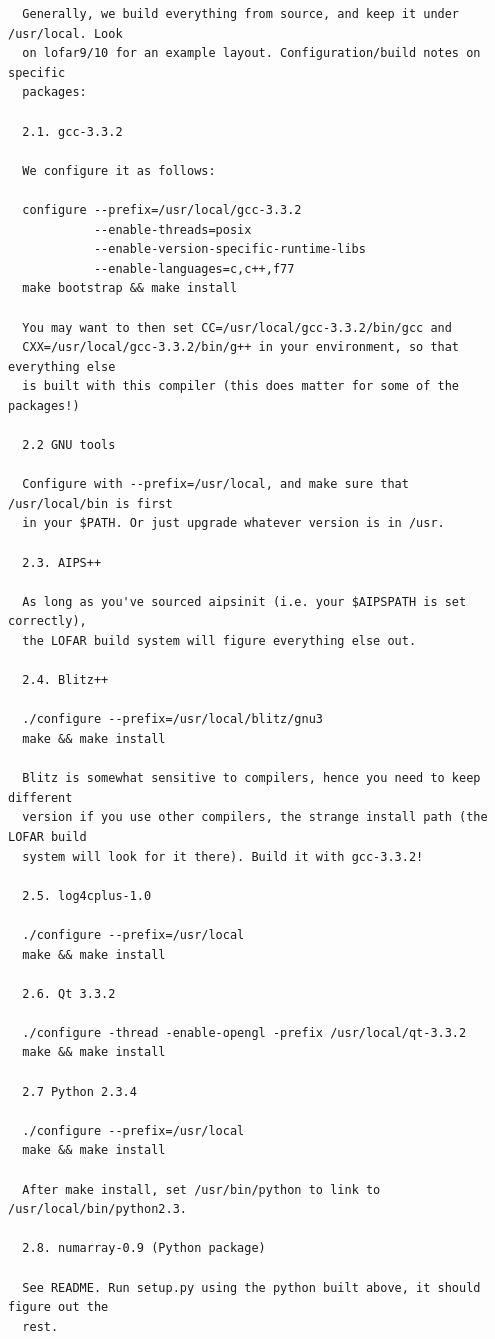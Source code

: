\documentclass[10pt]{article}
\begin{document}
\begin{verbatim}
  Generally, we build everything from source, and keep it under /usr/local. Look
  on lofar9/10 for an example layout. Configuration/build notes on specific
  packages:

  2.1. gcc-3.3.2 

  We configure it as follows:

  configure --prefix=/usr/local/gcc-3.3.2 
            --enable-threads=posix 
            --enable-version-specific-runtime-libs 
            --enable-languages=c,c++,f77
  make bootstrap && make install

  You may want to then set CC=/usr/local/gcc-3.3.2/bin/gcc and 
  CXX=/usr/local/gcc-3.3.2/bin/g++ in your environment, so that everything else
  is built with this compiler (this does matter for some of the packages!)

  2.2 GNU tools

  Configure with --prefix=/usr/local, and make sure that /usr/local/bin is first
  in your $PATH. Or just upgrade whatever version is in /usr.

  2.3. AIPS++ 

  As long as you've sourced aipsinit (i.e. your $AIPSPATH is set correctly),
  the LOFAR build system will figure everything else out.

  2.4. Blitz++

  ./configure --prefix=/usr/local/blitz/gnu3
  make && make install

  Blitz is somewhat sensitive to compilers, hence you need to keep different
  version if you use other compilers, the strange install path (the LOFAR build
  system will look for it there). Build it with gcc-3.3.2!

  2.5. log4cplus-1.0 

  ./configure --prefix=/usr/local
  make && make install

  2.6. Qt 3.3.2

  ./configure -thread -enable-opengl -prefix /usr/local/qt-3.3.2
  make && make install

  2.7 Python 2.3.4

  ./configure --prefix=/usr/local
  make && make install

  After make install, set /usr/bin/python to link to /usr/local/bin/python2.3.

  2.8. numarray-0.9 (Python package)

  See README. Run setup.py using the python built above, it should figure out the
  rest.


\end{verbatim}
\end{document}
